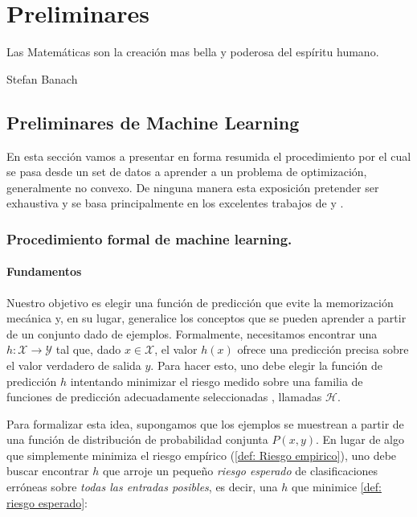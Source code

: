 \chapter{Preliminares}\label{ch:preliminares}

\epigraph{Las Matem\'aticas son la creaci\'on mas bella y poderosa del esp\'iritu humano.}{Stefan Banach}

\section{Preliminares de Machine Learning}

En esta secci\'on vamos a presentar en forma resumida el procedimiento por el cual se pasa desde un set de datos a aprender a un problema de optimizaci\'on, generalmente no convexo. De ninguna manera esta exposici\'on pretender ser exhaustiva y se basa principalmente en los excelentes trabajos de \cite{bottou:2016} y \cite{mohri:2012}.

\subsection{Procedimiento formal de machine learning.}

\subsubsection{Fundamentos} 
Nuestro objetivo es elegir una funci\'on de predicci\'on que evite la memorizaci\'on mec\'anica y, en su lugar, generalice los conceptos que se pueden aprender a partir de un conjunto dado de ejemplos. Formalmente, necesitamos encontrar una $h:\mathcal{X} \rightarrow \mathcal{Y}$ tal que, dado $x \in \mathcal{X}$, el valor $h (x)$ ofrece una predicci\'on precisa sobre el valor verdadero de salida $y$. Para hacer esto, uno debe elegir la funci\'on de predicci\'on $h$ intentando minimizar el riesgo medido sobre una familia de funciones de predicci\'on adecuadamente seleccionadas \cite{vapnik:1971}, llamadas $\mathcal{H}$.

Para formalizar esta idea, supongamos que los ejemplos se muestrean a partir de una funci\'on de distribuci\'on de probabilidad conjunta $P (x, y)$. En lugar de algo que simplemente minimiza el riesgo emp\'irico (\ref{def: Riesgo empirico}), uno debe buscar encontrar $h$ que arroje un peque\~no \textit{riesgo esperado} de clasificaciones err\'oneas sobre \textit{todas las entradas posibles}, es decir, una $h$ que minimice \ref{def: riesgo esperado}:

